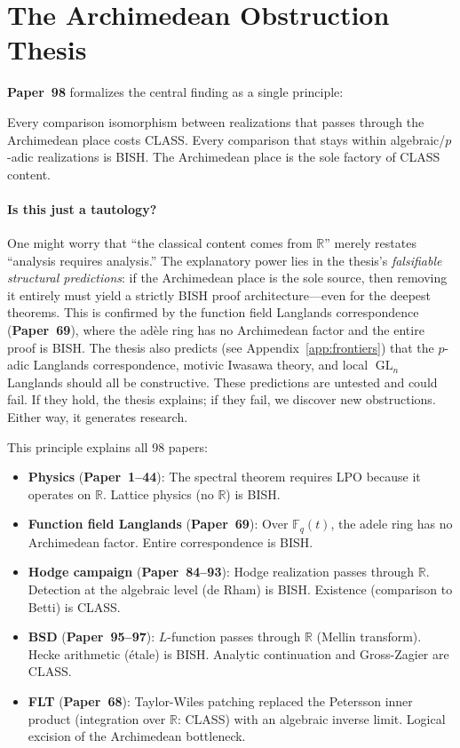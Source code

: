 \documentclass[11pt,twoside,openany]{report}
\theoremstyle{remark}
\newcommand{\BISH}{\textsf{BISH}}
\newcommand{\LPO}{\textsf{LPO}}
\newcommand{\CLASS}{\textsf{CLASS}}
\newcommand{\paperref}[1]{\textbf{Paper~#1}}
\DeclareMathOperator{\GL}{GL}
\begin{document}
\section{The Archimedean Obstruction Thesis}

\paperref{98} formalizes the central finding as a single principle:

\begin{thesisbox}
Every comparison isomorphism between realizations that passes through the Archimedean place costs \CLASS. Every comparison that stays within algebraic/$p$-adic realizations is \BISH. The Archimedean place is the sole factory of \CLASS{} content.
\end{thesisbox}

\paragraph{Is this just a tautology?} One might worry that ``the classical content comes from $\mathbb{R}$'' merely restates ``analysis requires analysis.'' The explanatory power lies in the thesis's \emph{falsifiable structural predictions}: if the Archimedean place is the sole source, then removing it entirely must yield a strictly \BISH{} proof architecture---even for the deepest theorems. This is confirmed by the function field Langlands correspondence (\paperref{69}), where the ad\`ele ring has no Archimedean factor and the entire proof is \BISH. The thesis also predicts (see Appendix~\ref{app:frontiers}) that the $p$-adic Langlands correspondence, motivic Iwasawa theory, and local $\GL_n$ Langlands should all be constructive. These predictions are untested and could fail. If they hold, the thesis explains; if they fail, we discover new obstructions. Either way, it generates research.

This principle explains all 98 papers:

\begin{itemize}
  \item \textbf{Physics} (\paperref{1--44}): The spectral theorem requires \LPO{} because it operates on $\mathbb{R}$. Lattice physics (no $\mathbb{R}$) is \BISH.
  \item \textbf{Function field Langlands} (\paperref{69}): Over $\mathbb{F}_q(t)$, the adele ring has no Archimedean factor. Entire correspondence is \BISH.
  \item \textbf{Hodge campaign} (\paperref{84--93}): Hodge realization passes through $\mathbb{R}$. Detection at the algebraic level (de Rham) is \BISH. Existence (comparison to Betti) is \CLASS.
  \item \textbf{BSD} (\paperref{95--97}): $L$-function passes through $\mathbb{R}$ (Mellin transform). Hecke arithmetic (\'etale) is \BISH. Analytic continuation and Gross-Zagier are \CLASS.
  \item \textbf{FLT} (\paperref{68}): Taylor-Wiles patching replaced the Petersson inner product (integration over $\mathbb{R}$: \CLASS) with an algebraic inverse limit. Logical excision of the Archimedean bottleneck.
\end{itemize}
\end{document}
